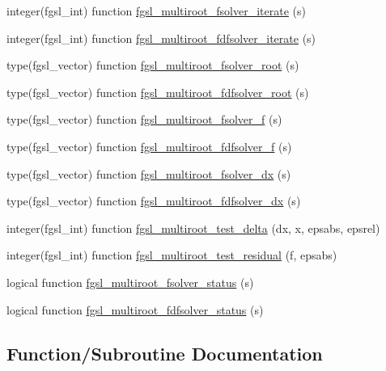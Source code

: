 \begin{DoxyCompactItemize}
\item 
integer(fgsl\+\_\+int) function \hyperlink{multiroots_8finc_ad1d089816977209d88134f95979c2726}{fgsl\+\_\+multiroot\+\_\+fsolver\+\_\+iterate} (s)
\item 
integer(fgsl\+\_\+int) function \hyperlink{multiroots_8finc_a7c2d7b128df269454d93454e6d4117f2}{fgsl\+\_\+multiroot\+\_\+fdfsolver\+\_\+iterate} (s)
\item 
type(fgsl\+\_\+vector) function \hyperlink{multiroots_8finc_a756becbde20557aeffb366a0bbcf8177}{fgsl\+\_\+multiroot\+\_\+fsolver\+\_\+root} (s)
\item 
type(fgsl\+\_\+vector) function \hyperlink{multiroots_8finc_a5b98f55eae83d12a4c0d70b7b6c26508}{fgsl\+\_\+multiroot\+\_\+fdfsolver\+\_\+root} (s)
\item 
type(fgsl\+\_\+vector) function \hyperlink{multiroots_8finc_a7a1a3c9bbcec3621cad66f2a87608bd5}{fgsl\+\_\+multiroot\+\_\+fsolver\+\_\+f} (s)
\item 
type(fgsl\+\_\+vector) function \hyperlink{multiroots_8finc_a3d551eb292c92b30f9628ea8e1d6d251}{fgsl\+\_\+multiroot\+\_\+fdfsolver\+\_\+f} (s)
\item 
type(fgsl\+\_\+vector) function \hyperlink{multiroots_8finc_af5cd6b1ed7e6cb7589c2e64cd4ff22e9}{fgsl\+\_\+multiroot\+\_\+fsolver\+\_\+dx} (s)
\item 
type(fgsl\+\_\+vector) function \hyperlink{multiroots_8finc_a6fa2ba8b4311978a0a28d45afacffeaf}{fgsl\+\_\+multiroot\+\_\+fdfsolver\+\_\+dx} (s)
\item 
integer(fgsl\+\_\+int) function \hyperlink{multiroots_8finc_ad67125d3ae3d333fa1211fdb9ee6c58a}{fgsl\+\_\+multiroot\+\_\+test\+\_\+delta} (dx, x, epsabs, epsrel)
\item 
integer(fgsl\+\_\+int) function \hyperlink{multiroots_8finc_a112c4005ac06aedd7bf4233dbad69244}{fgsl\+\_\+multiroot\+\_\+test\+\_\+residual} (f, epsabs)
\item 
logical function \hyperlink{multiroots_8finc_a1c59daa00ab109e098aab62bc3377912}{fgsl\+\_\+multiroot\+\_\+fsolver\+\_\+status} (s)
\item 
logical function \hyperlink{multiroots_8finc_aa39ce86a033dc3df2cdabd8c2c98215f}{fgsl\+\_\+multiroot\+\_\+fdfsolver\+\_\+status} (s)
\end{DoxyCompactItemize}


\subsection{Function/\+Subroutine Documentation}
\hypertarget{multiroots_8finc_ab89adde0a73d47f7bcc272997b3f6c8d}{}
